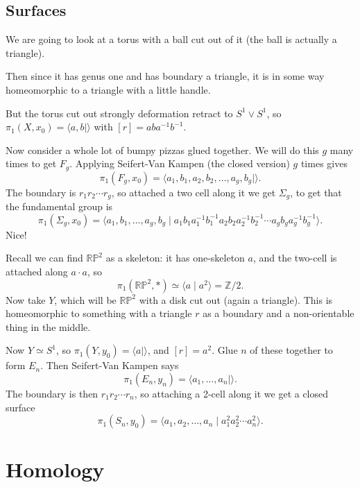 \documentclass[12pt]{article}
\begin{document}
\subsection{Surfaces}
\label{sub:surf}

\begin{exbox}
	We are going to look at a torus with a ball cut out of it (the ball is actually a triangle).

	Then since it has genus one and has boundary a triangle, it is in some way homeomorphic to a triangle with a little handle.

	But the torus cut out strongly deformation retract to $S^1 \vee S^1$, so $\pi_1(X, x_0) = \langle a, b \mid \rangle$ with $[r] = aba^{-1}b^{-1}$.

	Now consider a whole lot of bumpy pizzas glued together. We will do this $g$ many times to get $F_g$. Applying Seifert-Van Kampen (the closed version) $g$ times gives
	\[
	\pi_1(F_g, x_0) = \langle a_1, b_1, a_2, b_2, \ldots, a_g, b_g \mid\rangle.
	\]
	The boundary is $r_1 r_2 \cdots r_g$, so attached a two cell along it we get $\Sigma_g$, to get that the fundamental group is
	\[
	\pi_1(\Sigma_g, x_0) = \langle a_1, b_1, \ldots, a_g, b_g \mid a_1b_1a_1^{-1}b_1^{-1} a_2 b_2 a_2^{-1} b_2^{-1} \cdots a_g b_g a_g^{-1} b_g^{-1} \rangle.
	\]
	Nice!
\end{exbox}

\begin{exbox}
	Recall we can find $\mathbb{RP}^2$ as a skeleton: it has one-skeleton $a$, and the two-cell is attached along $a \cdot a$, so
	\[
	\pi_1(\mathbb{RP}^2, \ast) \simeq \langle a \mid a^2\rangle = \mathbb{Z}/2.
	\]
	Now take $Y$, which will be $\mathbb{RP}^2$ with a disk cut out (again a triangle). This is homeomorphic to something with a triangle $r$ as a boundary and a non-orientable thing in the middle.

	Now $Y \simeq S^1$, so $\pi_1(Y, y_0) = \langle a \mid \rangle$, and $[r] = a^2$. Glue $n$ of these together to form $E_n$. Then Seifert-Van Kampen says
	\[
	\pi_1(E_n, y_n) = \langle a_1, \ldots, a_n \mid \rangle.
	\]
	The boundary is then $r_1 r_2 \cdots r_n$, so attaching a 2-cell along it we get a closed surface
	\[
	\pi_1(S_n, y_0) = \langle a_1, a_2, \ldots, a_n \mid a_1^2 a_2^2 \cdots a_n^2 \rangle.
	\]
\end{exbox}


\newpage

\section{Homology}
\label{sec:hom}
\end{document}
